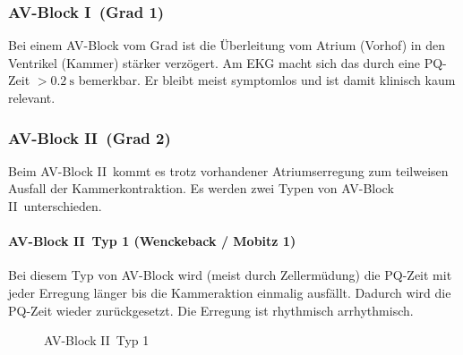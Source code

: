 \subsubsection{AV-Block I\textdegree\ (Grad 1)}
Bei einem AV-Block vom Grad ist die Überleitung vom Atrium (Vorhof) in den Ventrikel (Kammer) stärker verzögert. Am EKG macht sich das durch eine PQ-Zeit $>\SI{0.2}{\second}$ bemerkbar. Er bleibt meist symptomlos und ist damit klinisch kaum relevant.

\subsubsection{AV-Block II\textdegree\ (Grad 2)}
Beim AV-Block II\textdegree\ kommt es trotz vorhandener Atriumserregung zum teilweisen Ausfall der Kammerkontraktion. Es werden zwei Typen von AV-Block II\textdegree\ unterschieden.
\paragraph{AV-Block II\textdegree\ Typ 1 (Wenckeback / Mobitz 1)}
Bei diesem Typ von AV-Block wird (meist durch Zellermüdung) die PQ-Zeit mit jeder Erregung länger bis die Kammeraktion einmalig ausfällt. Dadurch wird die PQ-Zeit wieder zurückgesetzt. Die Erregung ist rhythmisch arrhythmisch.
\begin{figure}[H]
	\begin{ecg}
	\end{ecg}
	\caption{AV-Block II\textdegree\ Typ 1} \label{01:EKG-AV-Grad2-Wenckebach}
\end{figure}

